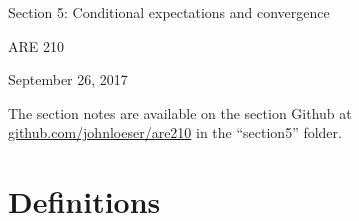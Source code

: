 \documentclass[12pt,english]{article}
\begin{document}
\begin{center}
{\Large{}Section 5: Conditional expectations and convergence}
\par\end{center}{\Large \par}

\begin{center}
ARE 210
\par\end{center}

\begin{center}
September 26, 2017
\par\end{center}

The section notes are available on the section Github at \href{github.com/johnloeser/are210}{github.com/johnloeser/are210} in the ``section5'' folder.

\section{Definitions}
\end{document}
